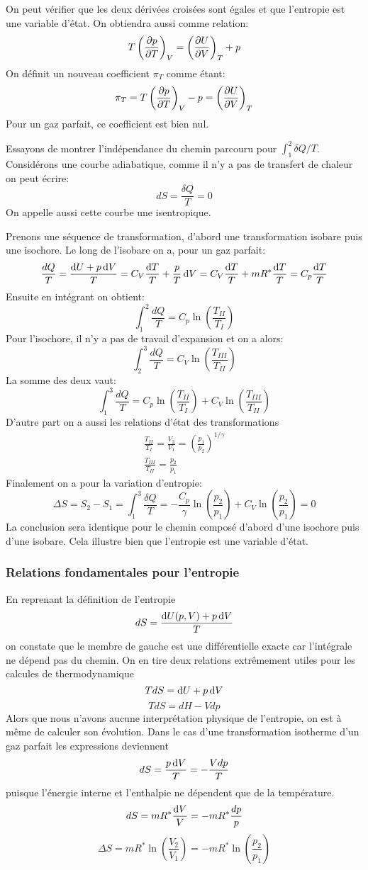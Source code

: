 On peut vérifier que les deux dérivées croisées sont égales et
que l'entropie est une variable d'état.
On obtiendra aussi comme relation:
\[ T\left(\frac{\partial p}{\partial T}\right)_V =
\left(\frac{\partial U}{\partial V}\right)_T+p \]
On définit un nouveau coefficient $\pi_T$ comme étant:
\[ \pi_T = T\left(\frac{\partial p}{\partial T}\right)_V -p =
\left(\frac{\partial U}{\partial V}\right)_T \]
Pour un gaz parfait, ce coefficient est bien nul.

Essayons de montrer l'indépendance du chemin parcouru
pour $\int_1^2 \delta Q/T$.
Considérons une courbe adiabatique,
comme il n'y a pas de transfert de chaleur on peut écrire:
\[ dS = \frac{\delta Q}{T} = 0 \]
On appelle aussi cette courbe une isentropique.

Prenons une séquence de transformation,
d'abord une transformation isobare puis une isochore.
Le long de l'isobare on a, pour un gaz parfait:
\[ \frac{dQ}{T} = \frac{\operatorname{d}\! U+p\operatorname{d}\! V}{T} =
C_V \frac{\operatorname{d}\! T}{T}+\frac pT\operatorname{d}\! V =
C_V \frac{\operatorname{d}\! T}T+mR^*\frac{\operatorname{d}\! T}T = C_p\frac{\operatorname{d}\! T}T \]
Ensuite en intégrant on obtient:
\[ \int_1^2 \frac{dQ}T = C_p \ln \left (\frac{T_{II}}{T_{I}}\right) \]
Pour l'isochore, il n'y a pas de travail d'expansion et on a alors:
\[ \int_2^3 \frac{dQ}T = C_V \ln \left (\frac{T_{III}}{T_{II}}\right) \]
La somme des deux vaut:
\[ \int_1^3 \frac{dQ}T = C_p \ln \left (\frac{T_{II}}{T_{I}}\right)+
C_V \ln \left (\frac{T_{III}}{T_{II}}\right) \]
D'autre part on a aussi les relations d'état des transformations
\begin{align*}
  \frac{T_{II}}{T_I} = \frac{V_2}{V_1} =
  \left(\frac{p_1}{p_2}\right)^{1/\gamma}\\
  \frac{T_{III}}{T_{II}} = \frac {p_2}{p_1}
\end{align*}
Finalement on a pour la variation d'entropie:
\[ \Delta S = S_2-S_1 = \int_1^3 \frac{\delta Q}T =
-\frac{C_p}{\gamma} \ln \left(\frac{p_2}{p_1}\right) +
C_V \ln \left (\frac{p_2}{p_1}\right) = 0 \]
La conclusion sera identique pour le chemin composé d'abord
d'une isochore puis d'une isobare.
Cela illustre bien que l'entropie est une variable d'état.

\subsubsection{Relations fondamentales pour l'entropie}
En reprenant la définition de l'entropie
\[ dS = \frac{\operatorname{d}\! U(p,V)+p\operatorname{d}\! V}{T} \]
on constate que le membre de gauche est une différentielle exacte
car l'intégrale ne dépend pas du chemin.
On en tire deux relations extrêmement utiles
pour les calcules de thermodynamique
\[ TdS = \operatorname{d}\! U+p\operatorname{d}\! V \]
\[ TdS = dH-Vdp \]
Alors que nous n'avons aucune interprétation physique de l'entropie,
on est à même de calculer son évolution.
Dans le cas d'une transformation isotherme
d'un gaz parfait les expressions deviennent
\[ dS = \frac{p\operatorname{d}\! V}{T} = -\frac{Vdp}{T} \]
puisque l'énergie interne et l'enthalpie ne dépendent que de la température.
\[ dS = mR^*\frac{\operatorname{d}\! V}{V} = -mR^*\frac{dp}p \]
\[ \Delta S = mR^* \ln \left(\frac{V_2}{V_1}\right) =
-mR^* \ln \left(\frac{p_2}{p_1}\right) \]

